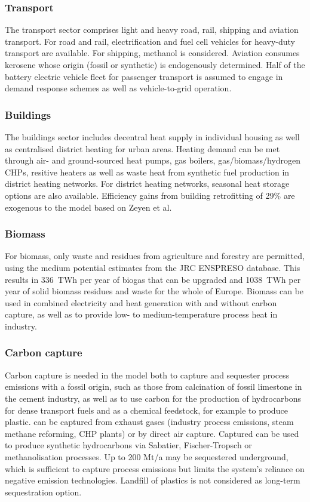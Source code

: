 \subsubsection*{Transport}

The transport sector comprises light and heavy road, rail, shipping and
aviation transport. For road and rail, electrification and fuel cell vehicles
for heavy-duty transport are available. For shipping, methanol is considered.
Aviation consumes kerosene whose origin (fossil or synthetic) is endogenously
determined. Half of the battery electric vehicle fleet for passenger transport
is assumed to engage in demand response schemes as well as vehicle-to-grid
operation.

\subsubsection*{Buildings}

The buildings sector includes decentral heat supply in individual
housing as well as centralised district heating for urban areas. Heating demand
can be met through air- and ground-sourced heat pumps, gas boilers,
gas/biomass/hydrogen CHPs, resitive heaters as well as waste heat from synthetic
fuel production in district heating networks. For district heating networks,
seasonal heat storage options are also available. Efficiency gains from building
retrofitting of 29\% are exogenous to the model based on Zeyen et
al.\cite{zeyenMitigatingHeat2021}

\subsubsection*{Biomass}

For biomass, only waste and residues from agriculture and forestry are
permitted, using the medium potential estimates from the JRC ENSPRESO database.
\cite{ruizENSPRESOOpen2019} This results in 336~TWh per year of biogas that can
be upgraded and 1038~TWh per year of solid biomass residues and waste for the
whole of Europe. Biomass can be used in combined electricity and heat generation
with and without carbon capture, as well as to provide low- to
medium-temperature process heat in industry.

\subsubsection*{Carbon capture}

Carbon capture is needed in the model both to capture and sequester
process emissions with a fossil origin, such as those from calcination of fossil
limestone in the cement industry, as well as to use carbon for the production of
hydrocarbons for dense transport fuels and as a chemical feedstock, for example
to produce plastic. \co can be captured from exhaust gases (industry process
emissions, steam methane reforming, CHP plants) or by direct air capture.
Captured \co can be used to produce synthetic hydrocarbons via Sabatier,
Fischer-Tropsch or methanolisation processes. Up to 200 Mt\co/a may be
sequestered underground, which is sufficient to capture process emissions but
limits the system's reliance on negative emission technologies. Landfill of
plastics is not considered as long-term sequestration option.

